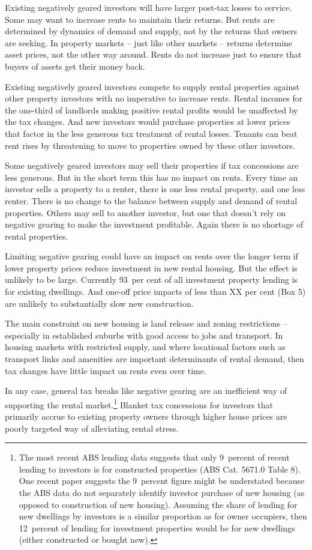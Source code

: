 \documentclass{grattan}\usepackage[]{graphicx}\usepackage[]{color}
\begin{document}
Existing negatively geared investors will have larger post-tax losses to service. Some may want to increase rents to maintain their returns. But rents are determined by dynamics of demand and supply, not by the returns that owners are seeking. In property markets -- just like other markets -- returns determine asset prices, not the other way around. Rents do not increase just to ensure that buyers of assets get their money back.

Existing negatively geared investors compete to supply rental properties against other property investors with no imperative to increase rents. Rental incomes for the one-third of landlords making positive rental profits would be unaffected by the tax changes. And new investors would purchase properties at lower prices that factor in the less generous tax treatment of rental losses. Tenants can beat rent rises by threatening to move to properties owned by these other investors. 

Some negatively geared investors may sell their properties if tax concessions are less generous. But in the short term this has no impact on rents.  Every time an investor sells a property to a renter, there is one less rental property, and one less renter. There is no change to the balance between supply and demand of rental properties. Others may sell to another investor, but one that doesn't rely on negative gearing to make the investment profitable. Again there is no shortage of rental properties. 

Limiting negative gearing could have an impact on rents over the longer term if lower property prices reduce investment in new rental housing. But the effect is unlikely to be large. Currently 93~per cent of all investment property lending is for existing dwellings.  And one-off price impacts of less than XX per cent (Box 5) are unlikely to substantially slow new construction.  

The main constraint on new housing is land release and zoning restrictions -- especially in established suburbs with good access to jobs and transport.    In housing markets with restricted supply, and where locational factors such as transport links and amenities are important determinants of rental demand, then tax changes have little impact on rents even over time. 



In any case, general tax breaks like negative gearing are an inefficient way of supporting the rental market.\footnote{ 
  The most recent ABS lending data suggests that only 9~percent of recent lending to investors is for constructed properties (ABS Cat. 5671.0 Table 8). One recent paper suggests the 9~percent figure might be understated because the ABS data do not separately identify investor purchase of new housing (as opposed to construction of new housing). Assuming the share of lending for new dwellings by investors is a similar proportion as for owner occupiers, then 12~percent of lending for investment properties would be for new dwellings (either constructed or bought new). }   Blanket tax concessions for investors that primarily accrue to existing property owners through higher house prices are poorly targeted way of alleviating rental stress.  
\end{document}

